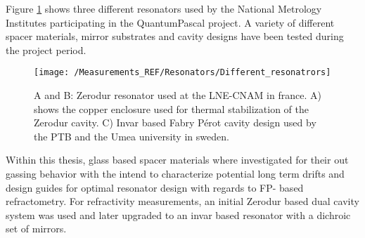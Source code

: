 Figure \ref{fig:Different_resonatrors} shows three different resonators used by the National Metrology Institutes participating in the QuantumPascal project. A variety of different spacer materials, mirror substrates and cavity designs have been tested during the project period. 
\begin{figure}[H]
	\centering 
	\texttt{[image: /Measurements\_REF/Resonators/Different\_resonatrors]}
	\caption{A and B: Zerodur resonator used at the LNE-CNAM in france. A) shows the copper enclosure used for thermal stabilization of the Zerodur cavity. C) Invar based Fabry Pérot cavity design used by the PTB and the Umea university in sweden.}
	\label{fig:Different_resonatrors}
\end{figure}
\noindent
Within this thesis, glass based spacer materials where investigated for their out gassing behavior with the intend to characterize potential long term drifts and design guides for optimal resonator design with regards to FP- based refractometry. For refractivity measurements, an initial Zerodur based dual cavity system was used and later upgraded to an invar based resonator with a dichroic set of mirrors.
